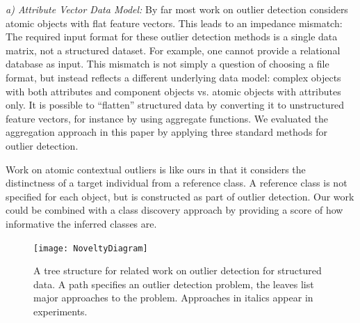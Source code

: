 \documentclass[conference]{IEEEtran}
\begin{document}
\textit{a) Attribute Vector Data Model:}
 By far most work on outlier detection considers atomic objects with flat feature vectors.
This leads to an impedance mismatch: 
The required input format for these outlier detection methods is a single data matrix, not a structured dataset. For example, one cannot provide a relational database as input. This mismatch is not simply a question of choosing a file format, but instead reflects a different underlying data model: complex objects with both attributes and component objects vs. atomic objects with attributes only. 
%
It is possible to ``flatten'' structured data by converting it to unstructured feature vectors, for instance by using aggregate functions. 
We evaluated the aggregation approach in this paper by applying three standard methods for outlier detection.
%

Work on atomic contextual  outliers \cite{Tang2013} is like ours in that it considers the distinctness of a target individual from a reference class. A reference class is not specified for each object,
but is constructed as part of outlier detection. 
Our work could be combined with a class discovery approach by providing a score of how informative the inferred classes are. 
\begin{figure}
	\centering
	\texttt{[image: NoveltyDiagram]}
	\caption{A tree structure for related work on outlier detection for structured data. A path specifies an outlier detection problem, the leaves list major approaches to the problem. Approaches in italics appear in experiments.
		\label{fig:novelty}}
\end{figure}
\end{document}
